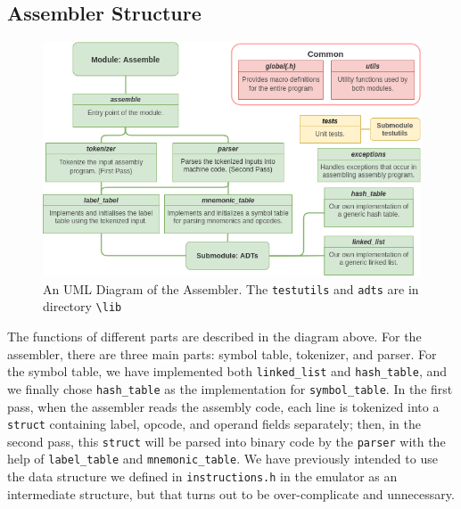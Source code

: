 \documentclass[11pt]{article}
\begin{document}
\subsection{Assembler Structure}
\begin{figure}[!ht]
  \centering
  \includegraphics[scale = 0.55]{project_structure_assemble.png}
  \caption{An UML Diagram of the Assembler. The \texttt{testutils} and \texttt{adts} are in directory \texttt{\textbackslash lib}}
  \label{part1:UML}
\end{figure}
\begin{flushleft}
The functions of different parts are described in the diagram above. For the assembler, there are three main parts: symbol table, tokenizer, and parser. For the symbol table, we have implemented both \texttt{linked\_list} and \texttt{hash\_table}, and we finally chose \texttt{hash\_table} as the implementation for \texttt{symbol\_table}. In the first pass, when the assembler reads the assembly code, each line is tokenized into a \texttt{struct} containing label, opcode, and operand fields separately; then, in the second pass, this \texttt{struct} will be parsed into binary code by the \texttt{parser} with the help of \texttt{label\_table} and \texttt{mnemonic\_table}. We have previously intended to use the data structure we defined in \texttt{instructions.h} in the emulator as an intermediate structure, but that turns out to be over-complicate and unnecessary. 
\end{flushleft}

\end{document}
